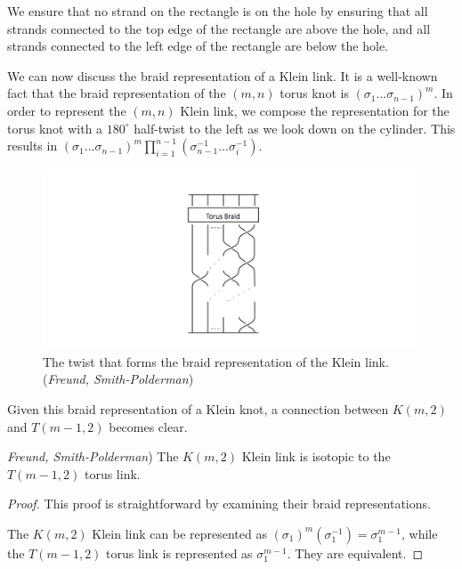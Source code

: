 \documentclass[12pt]{article}
\newenvironment{theorem}[2][Theorem]{\begin{trivlist}
\item[\hskip \labelsep {\bfseries #1}\hskip \labelsep {\bfseries #2.}]}{\end{trivlist}}
\begin{document}
We ensure that no strand on the rectangle is on the hole by ensuring that all strands connected to the top edge of the rectangle are above the hole, and all strands connected to the left edge of the rectangle are below the hole. 




We can now discuss the braid representation of a Klein link. It is a well-known fact that the braid representation of the $(m, n)$ torus knot is $(\sigma _1 ...\sigma _{n-1})^m$. In order to represent the $(m,n)$ Klein link, we compose the representation for the torus knot with a $180^{\circ}$ half-twist to the left as we look down on the cylinder. This results in $(\sigma _1 ...\sigma _{n-1})^m\prod_{i=1} ^{n-1} (\sigma_{n-1}^{-1}...\sigma_{i}^{-1})$.

\begin{figure}[H]
\centering
\includegraphics{braidrepklein}
\caption{\label{Braid rep klein knot} The twist that forms the braid representation of the Klein link. (\textit{Freund, Smith-Polderman})}
\end{figure}

Given this braid representation of a Klein knot, a connection between $K(m, 2)$ and $T(m-1, 2)$ becomes clear.  

\begin{theorem}{1.1} (\textit{Freund, Smith-Polderman})
The $K(m, 2)$ Klein link is isotopic to the $T(m-1, 2)$ torus link. 
\end{theorem}

\begin{proof}
This proof is straightforward by examining their braid representations. 

The $K(m, 2)$ Klein link can be represented as $(\sigma_1)^m (\sigma_1^{-1}) = \sigma_1^{m-1}$, while the $T(m-1, 2)$ torus link is represented as $\sigma_1^{m-1}$. They are equivalent. 
\end{proof}
\end{document}
